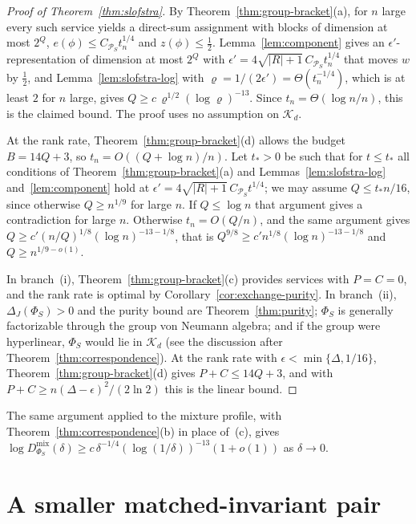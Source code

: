 \documentclass[11pt,a4paper]{article}
\theoremstyle{plain}
\theoremstyle{definition}
\theoremstyle{remark}
\newcommand{\Dmix}{D^{\mathrm{mix}}}
\begin{document}
\begin{proof}[Proof of Theorem~\ref{thm:slofstra}]
By Theorem~\ref{thm:group-bracket}(a), for $n$ large every such service yields a direct-sum assignment with blocks of dimension at most $2^Q$,
$e(\phi)\le C_{\mathcal P_S}t_n^{1/4}$ and $z(\phi)\le\frac12$. Lemma~\ref{lem:component} gives an $\epsilon'$-representation of dimension at most $2^Q$ with
$\epsilon'=4\sqrt{|R|+1}\,C_{\mathcal P_S}t_n^{1/4}$ that moves $w$ by $\frac12$, and Lemma~\ref{lem:slofstra-log} with $\varrho=1/(2\epsilon')=\Theta(t_n^{-1/4})$, which
is at least $2$ for $n$ large, gives $Q\ge c\,\varrho^{1/2}(\log\varrho)^{-13}$. Since $t_n=\Theta(\log n/n)$, this is the claimed bound. The proof uses no
assumption on $\mathcal K_d$.

At the rank rate, Theorem~\ref{thm:group-bracket}(d) allows the budget $B=14Q+3$, so $t_n=O((Q+\log n)/n)$. Let $t_*>0$ be such that for $t\le t_*$
all conditions of Theorem~\ref{thm:group-bracket}(a) and Lemmas~\ref{lem:slofstra-log} and~\ref{lem:component} hold at
$\epsilon'=4\sqrt{|R|+1}\,C_{\mathcal P_S}t^{1/4}$; we may assume $Q\le t_*n/16$, since otherwise $Q\ge n^{1/9}$ for large $n$. If $Q\le\log n$ that argument gives a contradiction for large $n$.
Otherwise $t_n=O(Q/n)$, and the same argument gives $Q\ge c'(n/Q)^{1/8}(\log n)^{-13-1/8}$, that is $Q^{9/8}\ge c'n^{1/8}(\log n)^{-13-1/8}$ and
$Q\ge n^{1/9-o(1)}$.

In branch~(i), Theorem~\ref{thm:group-bracket}(c) provides services with $P=C=0$, and the rank rate is optimal by
Corollary~\ref{cor:exchange-purity}. In branch~(ii), $\Delta_J(\Phi_S)>0$ and the purity bound are Theorem~\ref{thm:purity}; $\Phi_S$ is generally factorizable
through the group von Neumann algebra; and if the group were hyperlinear, $\Phi_S$ would lie in $\mathcal K_d$ (see the discussion after Theorem~\ref{thm:correspondence}). At the
rank rate with $\epsilon<\min\{\Delta,1/16\}$, Theorem~\ref{thm:group-bracket}(d) gives $P+C\le14Q+3$, and with $P+C\ge n(\Delta-\epsilon)^2/(2\ln2)$ this is the
linear bound.
\end{proof}

The same argument applied to the mixture profile, with Theorem~\ref{thm:correspondence}(b) in place of~(c), gives
$\log\Dmix_{\Phi_S}(\delta)\ge c\,\delta^{-1/4}(\log(1/\delta))^{-13}(1+o(1))$ as $\delta\to0$.


\section{A smaller matched-invariant pair}\label{sec:matched-proof}
\end{document}
